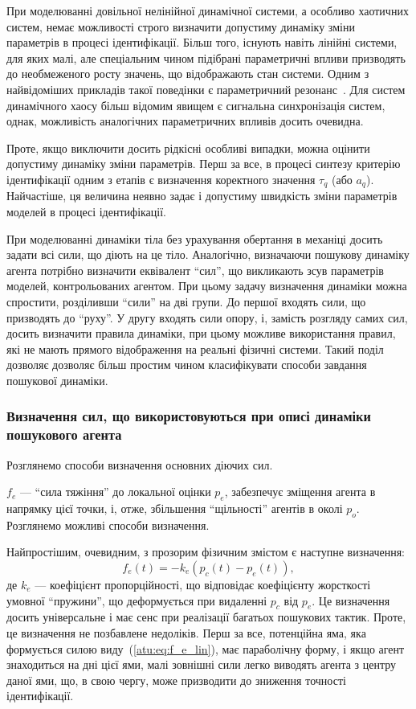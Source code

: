 При моделюванні довільної нелінійної динамічної системи,
а особливо хаотичних систем, немає можливості строго
визначити допустиму динаміку зміни параметрів в процесі
ідентифікації. Більш того, існують навіть лінійні системи, для
яких малі, але спеціальним чином підібрані параметричні впливи
призводять до необмеженого росту значень, що відображають
стан системи. Одним з найвідоміших прикладів такої поведінки є
параметричний резонанс~\cite{landau1}. Для систем динамічного хаосу
більш відомим явищем є сигнальна синхронізація систем, однак,
можливість аналогічних параметричних впливів досить очевидна.

Проте, якщо виключити досить рідкісні особливі випадки, можна
оцінити допустиму динаміку зміни параметрів. Перш за все,
в процесі синтезу критерію ідентифікації одним з етапів є
визначення коректного значення
$\tau_q$ (або $a_q$).
Найчастіше, ця величина неявно задає і допустиму
швидкість зміни параметрів моделей в процесі ідентифікації.

При моделюванні динаміки тіла без урахування обертання в механіці досить задати
всі сили, що діють на це тіло. Аналогічно, визначаючи пошукову динаміку агента
потрібно визначити еквівалент ``сил'', що викликають зсув параметрів моделей,
контрольованих агентом. При цьому задачу визначення динаміки можна спростити,
розділивши ``сили'' на дві групи. До першої входять сили, що призводять до ``руху''.
У другу входять сили опору, і, замість розгляду самих сил, досить
визначити правила динаміки, при цьому можливе використання правил, які не мають
прямого відображення на реальні фізичні системи.
Такий поділ дозволяє дозволяє більш простим чином класифікувати
способи завдання пошукової динаміки.


\subsubsection{Визначення сил, що використовуються при описі динаміки пошукового агента} %

Розглянемо способи визначення основних діючих сил.

$f_e$ ---
``сила тяжіння'' до локальної оцінки $p_e$, забезпечує зміщення
агента в напрямку цієї точки, і, отже, збільшення ``щільності'' агентів в
околі $p_o$.
Розглянемо можливі способи визначення.

Найпростішим, очевидним, з прозорим фізичним змістом є
наступне визначення:
%
\begin{equation}
  f_e(t) = - k_e \left( p_c(t) - p_e(t) \right)  ,
  \label{atu:eq:f_e_lin}
\end{equation}
%
де $k_e$ --- коефіцієнт пропорційності, що відповідає коефіцієнту жорсткості
умовної ``пружини'', що деформується при видаленні $p_c$ від $p_e$. Це
визначення досить універсальне і має сенс при реалізації багатьох пошукових
тактик.
%
Проте, це визначення не позбавлене недоліків. Перш за все,
потенційна яма, яка формується силою виду~(\ref{atu:eq:f_e_lin}), має параболічну
форму, і якщо агент знаходиться на дні цієї ями, малі зовнішні
сили легко виводять агента з центру даної ями, що, в свою чергу,
може призводити до зниження точності ідентифікації.

